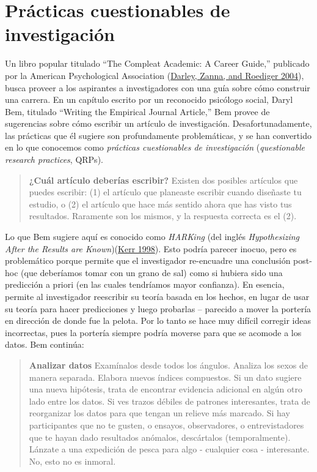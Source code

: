 \documentclass[
  12pt,
]{book}
\begin{document}
\hypertarget{pruxe1cticas-cuestionables-de-investigaciuxf3n}{%
\section{Prácticas cuestionables de investigación}\label{pruxe1cticas-cuestionables-de-investigaciuxf3n}}

Un libro popular titulado ``The Compleat Academic: A Career Guide,'' publicado por la American Psychological Association (\protect\hyperlink{ref-darl:zann:roed:2004}{Darley, Zanna, and Roediger 2004}), busca proveer a los aspirantes a investigadores con una guía sobre cómo construir una carrera. En un capítulo escrito por un reconocido psicólogo social, Daryl Bem, titulado ``Writing the Empirical Journal Article,'' Bem provee de sugerencias sobre cómo escribir un artículo de investigación. Desafortunadamente, las prácticas que él sugiere son profundamente problemáticas, y se han convertido en lo que conocemos como \emph{prácticas cuestionables de investigación} (\emph{questionable research practices}, QRPs).

\begin{quote}
\textbf{¿Cuál artículo deberías escribir?} Existen dos posibles artículos que puedes escribir: (1) el artículo que planeaste escribir cuando diseñaste tu estudio, o (2) el artículo que hace más sentido ahora que has visto tus resultados. Raramente son los mismos, y la respuesta correcta es el (2).
\end{quote}

Lo que Bem sugiere aquí es conocido como \emph{HARKing} (del inglés \emph{Hypothesizing After the Results are Known})(\protect\hyperlink{ref-kerr:1998}{Kerr 1998}). Esto podría parecer inocuo, pero es problemático porque permite que el investigador re-encuadre una conclusión post-hoc (que deberíamos tomar con un grano de sal) como si hubiera sido una predicción a priori (en las cuales tendríamos mayor confianza). En esencia, permite al investigador reescribir su teoría basada en los hechos, en lugar de usar su teoría para hacer predicciones y luego probarlas -- parecido a mover la portería en dirección de donde fue la pelota. Por lo tanto se hace muy difícil corregir ideas incorrectas, pues la portería siempre podría moverse para que se acomode a los datos. Bem continúa:

\begin{quote}
\textbf{Analizar datos} Examínalos desde todos los ángulos. Analiza los sexos de manera separada. Elabora nuevos índices compuestos. Si un dato sugiere una nueva hipótesis, trata de encontrar evidencia adicional en algún otro lado entre los datos. Si ves trazos débiles de patrones interesantes, trata de reorganizar los datos para que tengan un relieve más marcado. Si hay participantes que no te gusten, o ensayos, observadores, o entrevistadores que te hayan dado resultados anómalos, descártalos (temporalmente). Lánzate a una expedición de pesca para algo - cualquier cosa - interesante. No, esto no es inmoral.
\end{quote}
\end{document}
